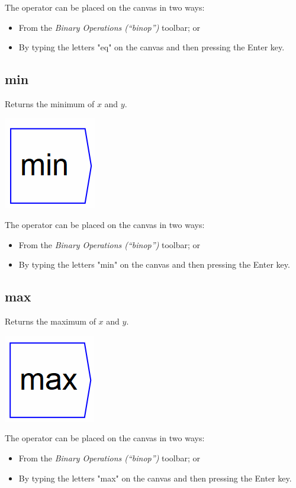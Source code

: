 The operator can be placed on the canvas in two ways:
\begin{itemize}
\item From the \emph{Binary Operations (``binop'')} toolbar; or 
\item By typing the letters "eq" on the canvas and then pressing the Enter
key. 
\end{itemize}

\subsection{min}

\label{Operation:min} Returns the minimum of $x$ and $y$.

\includegraphics{images/minkey}

The operator can be placed on the canvas in two ways:
\begin{itemize}
\item From the \emph{Binary Operations (``binop'')} toolbar; or 
\item By typing the letters "min" on the canvas and then pressing the
Enter key. 
\end{itemize}

\subsection{max}

\label{Operation:max} Returns the maximum of $x$ and $y$.

\includegraphics{images/maxkey}

The operator can be placed on the canvas in two ways:
\begin{itemize}
\item From the \emph{Binary Operations (``binop'') }toolbar; or 
\item By typing the letters "max" on the canvas and then pressing the
Enter key. 
\end{itemize}

